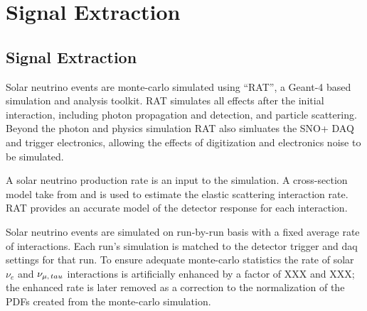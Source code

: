 \chapter{Signal Extraction}

\ifpdf
    \graphicspath{{sigex/figures/PNG/}{sigex/figures/PDF/}{sigex/figures/}}
\else
    \graphicspath{{sigex/figures/EPS/}{sigex/figures/}}
\fi


\section{Signal Extraction}
Solar neutrino events are monte-carlo simulated using ``RAT'', a Geant-4 based
simulation and analysis toolkit.
RAT simulates all effects after the initial interaction, including photon
propagation and detection, and particle scattering.
Beyond the photon and physics simulation RAT also simluates the SNO+ DAQ and trigger electronics,
allowing the effects of digitization and electronics noise to be simulated.

A solar neutrino production rate is an input to the simulation.
A cross-section model take from \cite{bahcall} and \cite{lookitup}
is used to estimate the elastic scattering interaction rate.
RAT provides an accurate model of the detector response for each interaction.

Solar neutrino events are simulated on run-by-run basis with a fixed average rate
of interactions.
Each run's simulation is matched to the detector trigger and
daq settings for that run. To ensure adequate monte-carlo statistics the
rate of solar $\nu_{e}$ and $\nu_{\mu\text{,\,}tau}$ interactions is artificially
enhanced by a factor of XXX and XXX; the enhanced rate is later removed as a correction
to the normalization of the PDFs created from the monte-carlo simulation.

